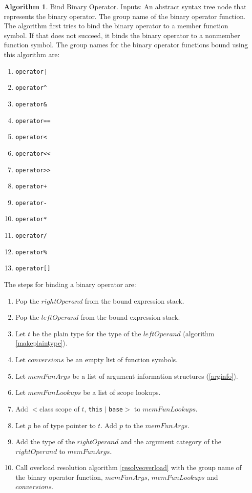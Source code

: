 \documentclass[a4paper,oneside,11pt]{book}
\theoremstyle{definition}
\newtheorem{algo}{Algorithm}[section]
\begin{document}
\begin{algo}\label{bindbinaryop} Bind Binary Operator.
Inputs: An abstract syntax tree node that represents the binary operator. The group name of the binary operator function.
The algorithm first tries to bind the binary operator to a member function symbol.
If that does not succeed, it binds the binary operator to a nonmember function symbol.
The group names for the binary operator functions bound using this algorithm are:
\begin{enumerate}
\item
\verb+operator|+
\item
\verb|operator^|
\item
\verb|operator&|
\item
\verb|operator==|
\item
\verb|operator<|
\item
\verb|operator<<|
\item
\verb|operator>>|
\item
\verb|operator+|
\item
\verb|operator-|
\item
\verb|operator*|
\item
\verb|operator/|
\item
\verb|operator%|
\item
\verb|operator[]|
\end{enumerate}
The steps for binding a binary operator are:
\begin{enumerate}
\item
Pop the $rightOperand$ from the bound expression stack.
\item
Pop the $leftOperand$ from the bound expression stack.
\item
Let $t$ be the plain type for the type of the $leftOperand$ (algorithm \ref{makeplaintype}).
\item
Let $conversions$ be an empty list of function symbols.
\item
Let $memFunArgs$ be a list of argument information structures (\ref{arginfo}).
\item
Let $memFunLookups$ be a list of scope lookups.
\item
Add $<$class scope of $t$, \verb|this| $|$ \verb|base|$>$ to $memFunLookups$.
\item
Let $p$ be of type pointer to $t$. Add $p$ to the $memFunArgs$.
\item
Add the type of the $rightOperand$ and the argument category of the $rightOperand$ to $memFunArgs$.
\item
Call overload resolution algorithm \ref{resolveoverload} with the group name of the binary operator function, $memFunArgs$, $memFunLookups$ and $conversions$.

\end{enumerate}
\end{algo}
\end{document}
